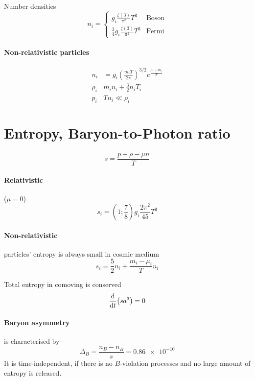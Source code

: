 \documentclass[12pt, a4paper, DIV=15]{article}
\numberwithin{equation}{section}
\begin{document}
Number densities
\begin{equation}
   n_i =
   \begin{cases}
      g_i \frac{\zeta(3)}{\pi^2} T^3 & \text{Boson} \\
      \frac{3}{4} g_i \frac{\zeta(3)}{\pi^2} T^3 & \text{Fermi}
   \end{cases}
\end{equation}

\paragraph{Non-relativistic particles}
\begin{align}
   n_i &= g_i \left( \frac{m_i T}{2\pi} \right)^{3/2} e^{\frac{\mu_i - m_i}{T}} \\
   \rho_i & m_i n_i + \frac{3}{2} n_i T_i \\
   p_i & T n_i \ll \rho_i
\end{align}

\section{Entropy, Baryon-to-Photon ratio}
\begin{equation}
   s = \frac{p + \rho -\mu n }{ T} 
\end{equation}

\paragraph{Relativistic} ($\mu = 0$)
\begin{equation}
   s_i = (1; \frac{7}{8}) g_i \frac{2\pi^2}{45} T^3
\end{equation}

\paragraph{Non-relativistic} particles' entropy is always small in cosmic medium
\begin{equation}
   s_i = \frac{5}{2} n_i + \frac{m_i - \mu_i}{T}n_i
\end{equation}

Total entropy in comoving is conserved
\begin{equation}
   \dv{t} (sa^3) = 0
\end{equation}

\paragraph{Baryon asymmetry} is characterised by
\begin{equation}
   \Delta_B =  \frac{n_B - n_{\bar{B}}}{s} = \num{0.86e-10}
\end{equation}
It is time-independent, if there is no $B$-violation processes and no large amount of entropy is released.
\end{document}
